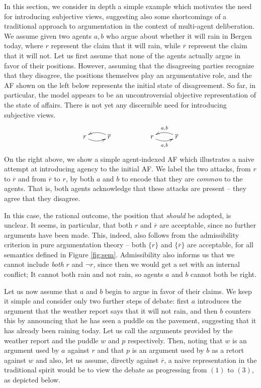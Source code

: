 \documentclass[greybox]{svmult}
\renewcommand{\bar}[1]{\overline{#1}}
\begin{document}
In this section, we consider in depth a simple example which motivates the need for introducing subjective views, suggesting also some shortcomings of a traditional approach to argumentation in the context of multi-agent deliberation. We assume given two agents $a,b$ who argue about whether it will rain in Bergen today, where $r$ represent the claim that it will rain, while $\overline r$ represent the claim that it will not. Let us first assume that none of the agents actually argue in favor of their positions. However, assuming that the disagreeing parties recognize that they disagree, the positions themselves play an argumentative role, and the AF shown on the left below represents the initial state of disagreement. So far, in particular, the model appears to be an uncontroversial objective representation of the state of affairs. There is not yet any discernible need for introducing subjective views. 
$$
\begin{array}{ccc}
\xymatrix{ r \ar@/_/[r] & \overline r \ar@/_/[l] } & \hspace{3em} &
\xymatrix{ r \ar@/_/[r]_{{ a},{ b}} & \bar r \ar@/_/[l]_{{ a},{ b}} }
\end{array}
$$
On the right above, we show a simple agent-indexed AF which illustrates a naive attempt at introducing agency to the initial AF. We label the two attacks, from $r$ to $\overline r$ and from $\overline r$ to $r$, by both $a$ and $b$ to encode that they are \emph{common} to the agents. That is, both agents acknowledge that these attacks are present -- they agree that they disagree.

In this case, the rational outcome, the position that \emph{should} be adopted, is unclear. It seems, in particular, that both $r$ and $\bar r$ are acceptable, since no further arguments have been made. This, indeed, also follows from the admissibility criterion in pure argumentation theory -- both $\{r\}$ and $\{\bar r\}$ are acceptable, for all semantics defined in Figure \ref{fig:sem}. Admissibility also informs us that we cannot include \emph{both} $r$ and $\neg r$, since then we would get a set with an internal conflict; It cannot both rain and not rain, so agents $a$ and $b$ cannot both be right.

Let us now assume that $a$ and $b$ begin to argue in favor of their claims. We keep it simple and consider only two further steps of debate: first $a$ introduces the argument that the weather report says that it will not rain, and then $b$ counters this by announcing that he has seen a puddle on the pavement, suggesting that it has already been raining today. Let us call the arguments provided by the weather report and the puddle $w$ and $p$ respectively. Then, noting that $w$ is an argument used by $a$ against $r$ and that $p$ is an argument used by $b$ as a retort against $w$ and also, let us assume, directly against $\bar r$, a naive representation in the traditional spirit would be to view the debate as progressing from $(1)$ to $(3)$, as depicted below.
\end{document}
